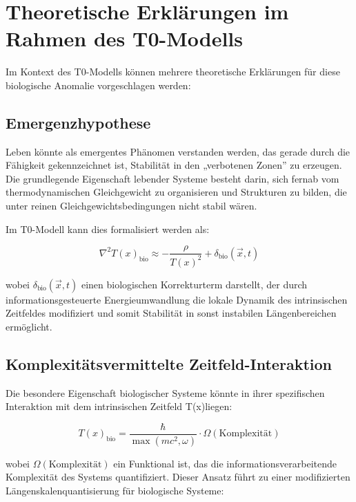 \documentclass[12pt,a4paper]{article}
\newcommand{\Tfield}{T(x)}
\begin{document}
	\section{Theoretische Erklärungen im Rahmen des T0-Modells}
	
	Im Kontext des T0-Modells können mehrere theoretische Erklärungen für diese biologische Anomalie vorgeschlagen werden:
	
	\subsection{Emergenzhypothese}
	
	Leben könnte als emergentes Phänomen verstanden werden, das gerade durch die Fähigkeit gekennzeichnet ist, Stabilität in den „verbotenen Zonen'' zu erzeugen. Die grundlegende Eigenschaft lebender Systeme besteht darin, sich fernab vom thermodynamischen Gleichgewicht zu organisieren und Strukturen zu bilden, die unter reinen Gleichgewichtsbedingungen nicht stabil wären.
	
	Im T0-Modell kann dies formalisiert werden als:
	
	\begin{equation}
		\nabla^2\Tfield_{\text{bio}} \approx -\frac{\rho}{\Tfield^2} + \delta_{\text{bio}}(\vec{x}, t)
	\end{equation}
	
	wobei $\delta_{\text{bio}}(\vec{x}, t)$ einen biologischen Korrekturterm darstellt, der durch informationsgesteuerte Energieumwandlung die lokale Dynamik des intrinsischen Zeitfeldes modifiziert und somit Stabilität in sonst instabilen Längenbereichen ermöglicht.
	
	\subsection{Komplexitätsvermittelte Zeitfeld-Interaktion}
	
	Die besondere Eigenschaft biologischer Systeme könnte in ihrer spezifischen Interaktion mit dem intrinsischen Zeitfeld \Tfield liegen:
	
	\begin{equation}
		\Tfield_{\text{bio}} = \frac{\hbar}{\max(mc^2, \omega)} \cdot \Omega(\text{Komplexität})
	\end{equation}
	
	wobei $\Omega(\text{Komplexität})$ ein Funktional ist, das die informationsverarbeitende Komplexität des Systems quantifiziert. Dieser Ansatz führt zu einer modifizierten Längenskalenquantisierung für biologische Systeme:
	
\end{document}
